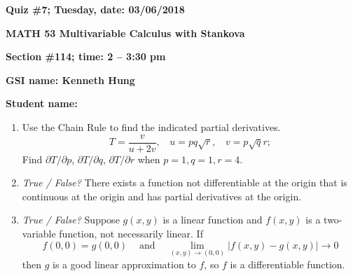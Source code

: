 \documentclass{article}
\begin{document}
{\bf Quiz \#7; Tuesday, date: 03/06/2018}

{\bf MATH 53 Multivariable Calculus with Stankova}

{\bf Section \#114; time: 2 -- 3:30 pm}

{\bf GSI name: Kenneth Hung}

{\bf Student name:}

\vspace*{0.25in}

\begin{enumerate}
\item Use the Chain Rule to find the indicated partial derivatives.
\[
T = \frac{v}{u + 2v}, ~~~~ u = pq \sqrt{r}, ~~~~ v = p \sqrt{q} r;
\]
Find $\partial T / \partial p$, $\partial T / \partial q$, $\partial T / \partial r$ when $p = 1, q = 1, r = 4$.

\item {\em True / False?} There exists a function not differentiable at the origin that is continuous at the origin and has partial derivatives at the origin.

\item {\em True / False?} Suppose $g(x, y)$ is a linear function and $f(x, y)$ is a two-variable function, not necessarily linear. If
\[
f(0, 0) = g(0, 0) ~~~~ \text{ and } ~~~~ \lim_{(x, y) \to (0, 0)} |f(x, y) - g(x, y)| \to 0
\]
then $g$ is a good linear approximation to $f$, so $f$ is a differentiable function.
\end{enumerate}
\end{document}
